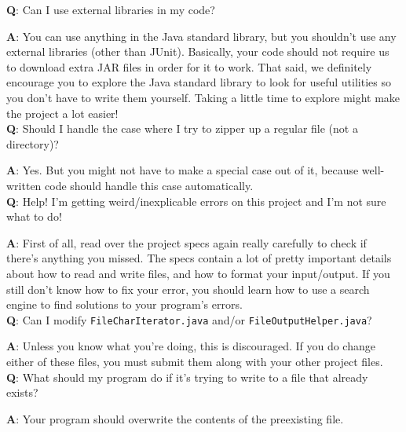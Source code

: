 \documentclass[11pt]{article}
\begin{document}
\textbf{Q}: Can I use external libraries in my code?

\textbf{A}: You can use anything in the Java standard library, but you shouldn't use any external libraries (other than JUnit). Basically, your code should not require us to download extra JAR files in order for it to work. That said, we definitely encourage you to explore the Java standard library to look for useful utilities so you don't have to write them yourself. Taking a little time to explore might make the project a lot easier!\\

\textbf{Q}: Should I handle the case where I try to zipper up a regular file (not a directory)?

\textbf{A}: Yes. But you might not have to make a special case out of it, because well-written code should handle this case automatically.\\

\textbf{Q}: Help! I'm getting weird/inexplicable errors on this project and I'm not sure what to do!

\textbf{A}: First of all, read over the project specs again really carefully to check if there's anything you missed. The specs contain a lot of pretty important details about how to read and write files, and how to format your input/output. If you still don't know how to fix your error, you should learn how to use a search engine to find solutions to your program's errors. \\

\textbf{Q}: Can I modify \texttt{FileCharIterator.java} and/or \texttt{FileOutputHelper.java}?

\textbf{A}: Unless you know what you're doing, this is discouraged. If you do change either of these files, you must submit them along with your other project files. \\

\textbf{Q}: What should my program do if it's trying to write to a file that already exists?

\textbf{A}: Your program should overwrite the contents of the preexisting file.
\end{document}
